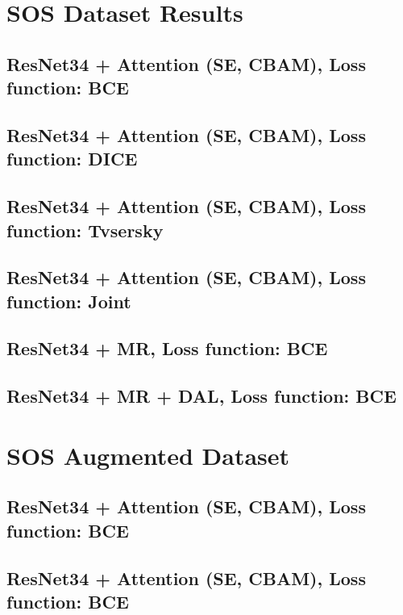 \documentclass{article}
\begin{document}
\section{SOS Dataset Results}
\subsection{ResNet34 + Attention (SE, CBAM), Loss function: BCE}


\subsection{ResNet34 + Attention (SE, CBAM), Loss function: DICE}


\subsection{ResNet34 + Attention (SE, CBAM), Loss function: Tvsersky}


\subsection{ResNet34 + Attention (SE, CBAM), Loss function: Joint}


\subsection{ResNet34 + MR, Loss function: BCE}


\subsection{ResNet34 + MR + DAL, Loss function: BCE}


\section{SOS Augmented Dataset}
\subsection{ResNet34 + Attention (SE, CBAM), Loss function: BCE}


\subsection{ResNet34 + Attention (SE, CBAM), Loss function: BCE}

\end{document}
